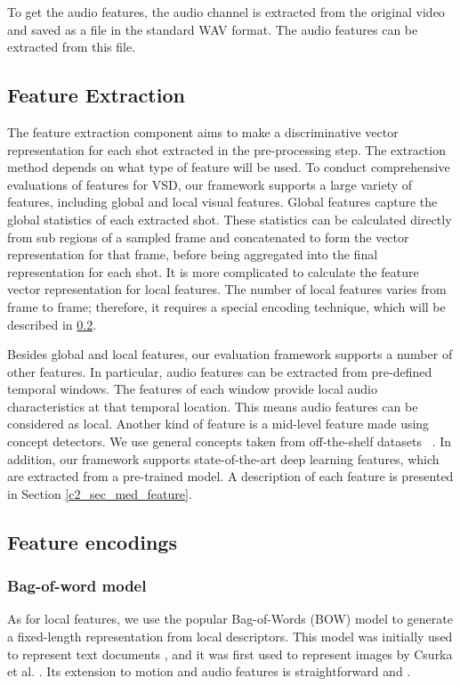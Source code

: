 To get the audio features, the audio channel is extracted from the original video and saved as a file in the standard WAV format. The audio features can be extracted from this file.

\subsection{Feature Extraction}

The feature extraction component aims to make a discriminative vector representation for each shot extracted in the pre-processing step. The extraction method depends on what type of feature will be used. To conduct comprehensive evaluations of features for VSD, our framework supports a large variety of features, including global and local visual features. Global features capture the global statistics of each extracted shot. These statistics can be calculated directly from sub regions of a sampled frame and concatenated to form the vector representation for that frame, before being aggregated into the final representation for each shot. It is more complicated to calculate the feature vector representation for local features. The number of local features varies from frame to frame; therefore, it requires a special encoding technique, which will be described in \ref{c2_sec_feature_encoding}.

Besides global and local features, our evaluation framework supports a number of other features. In particular, audio features can be extracted from pre-defined temporal windows. The features of each window provide local audio characteristics at that temporal location. This means audio features can be considered as local. Another kind of feature is a mid-level feature made using concept detectors. We use general concepts taken from off-the-shelf datasets ~\cite{deng2009imagenet}. In addition, our framework supports state-of-the-art deep learning features, which are extracted from a pre-trained model. A description of each feature is presented in Section \ref{c2_sec_med_feature}.

\subsection{Feature encodings}
\label{c2_sec_feature_encoding}

\subsubsection{Bag-of-word model}
As for local features, we use the popular Bag-of-Words (BOW) model to generate a fixed-length representation from local descriptors. This model was initially used to represent text documents \cite{harris1954distributional}, and it was first used to represent images by Csurka et al. \cite{csurka2004visual}. Its extension to motion and audio features is straightforward \cite{sivic2009efficient} and \cite{jiang2010columbia}.

